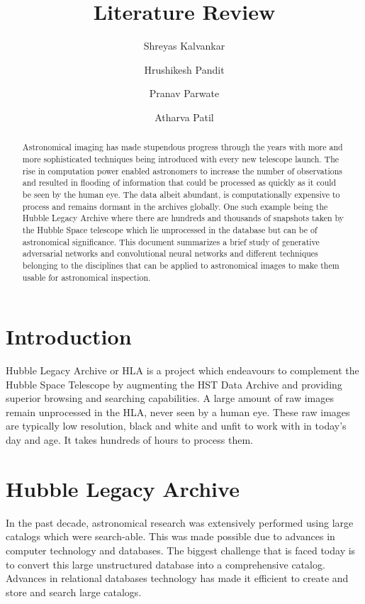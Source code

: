 \documentclass[12pt, letterpaper]{article}
\title{Literature Review}
\author{Shreyas Kalvankar \and Hrushikesh Pandit \and Pranav Parwate \and Atharva Patil}
\begin{document}
	\maketitle
	
	\begin{abstract}
		Astronomical imaging has made stupendous progress through the years with more and more sophisticated techniques being introduced with every new telescope launch. The rise in computation power enabled astronomers to increase the number of observations and resulted in flooding of information that could be processed as quickly as it could be seen by the human eye. The data albeit abundant, is computationally expensive to process and remains dormant in the archives globally. One such example being the Hubble Legacy Archive where there are hundreds and thousands of snapshots taken by the Hubble Space telescope which lie unprocessed in the database but can be of astronomical significance. This document summarizes a brief study of generative adversarial networks and convolutional neural networks and different techniques belonging to the disciplines that can be applied to astronomical images to make them usable for astronomical inspection. 
	\end{abstract}
	
	\section{Introduction}
		\hspace*{0.25 in}Hubble Legacy Archive or HLA is a project which endeavours to complement the Hubble Space Telescope by augmenting the HST Data Archive and providing superior browsing and searching capabilities. A large amount of raw images remain unprocessed in the HLA, never seen by a human eye. These raw images are typically low resolution, black and white and unfit to work with in today's day and age. It takes hundreds of hours to process them.
	\section{Hubble Legacy Archive}
		\hspace*{0.25 in}In the past decade, astronomical research was extensively performed using large catalogs which were search-able. This was made possible due to advances in computer technology and databases. The biggest challenge that is faced today is to convert this  large unstructured database into a comprehensive catalog. Advances in relational databases technology has made it efficient to create and store and search large catalogs. 
\end{document}
